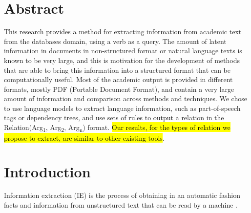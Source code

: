 \documentclass[11pt,a4paper,openright]{memoir}
\title{\theTitle}
\author{\theAuthor}
\begin{document}
\setlength\parindent{24pt}
\captionnamefont{\bfseries}

\frontmatter

\makeunswfrontmatter

\newpage
\thispagestyle{empty}
\strut
\vfill


\chapter*{Abstract}

This research provides a method for extracting information from academic text from the databases domain, using a verb as a query. The amount of latent information in documents in non-structured format or natural language  texts is known to be very large, and this is motivation for the development of methods that are able to bring this information into a structured format that can be computationally useful. Most of the academic output is provided in different formats, mostly PDF (Portable Document Format), and contain a very large amount of information and comparison across methods and techniques. We chose to use language models to extract language information, such as part-of-speech tags or dependency trees, and use sets of rules to output a relation in the Relation(Arg\textsubscript{1}, Arg\textsubscript{2}, Arg\textsubscript{n}) format. \hl{Our results, for the types of relation we propose to extract, are similar to other existing tools}.

\clearpage
\tableofcontents

\cleardoublepage

\mainmatter


%
%
%
%


\chapter{Introduction}
Information extraction (IE) is the process of obtaining in an automatic fashion facts and information from unstructured text that can be read by a machine \cite{Jurafsky:2000:SLP:555733}.
\end{document}
